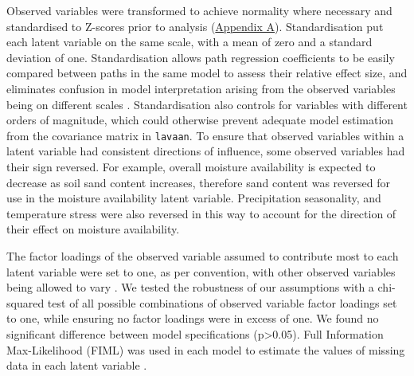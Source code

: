 \documentclass[11pt,a4paper]{article}
\begin{document}
Observed variables were transformed to achieve normality where necessary and standardised to Z-scores prior to analysis (\hyperref[appendixa]{Appendix A}). Standardisation put each latent variable on the same scale, with a mean of zero and a standard deviation of one. Standardisation allows path regression coefficients to be easily compared between paths in the same model to assess their relative effect size, and eliminates confusion in model interpretation arising from the observed variables being on different scales \citep{Beaujean2014}. Standardisation also controls for variables with different orders of magnitude, which could otherwise prevent adequate model estimation from the covariance matrix in \verb|lavaan|. To ensure that observed variables within a latent variable had consistent directions of influence, some observed variables had their sign reversed. For example, overall moisture availability is expected to decrease as soil sand content increases, therefore sand content was reversed for use in the moisture availability latent variable. Precipitation seasonality, and temperature stress were also reversed in this way to account for the direction of their effect on moisture availability. 


The factor loadings of the observed variable assumed to contribute most to each latent variable were set to one, as per convention, with other observed variables being allowed to vary \citep{Beaujean2014}.  We tested the robustness of our assumptions with a chi-squared test of all possible combinations of observed variable factor loadings set to one, while ensuring no factor loadings were in excess of one. We found no significant difference between model specifications (p>0.05). Full Information Max-Likelihood (FIML) was used in each model to estimate the values of missing data in each latent variable \citep{Cham2017}.
\end{document}
